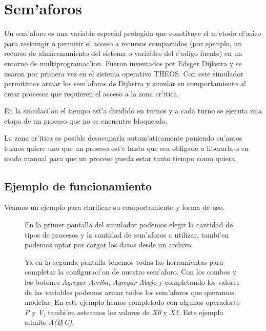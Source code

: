 \section{Sem'aforos}
Un sem'aforo es una variable especial protegida que constituye el m'etodo
cl'asico para restringir o permitir el acceso a recursos compartidos (por
ejemplo, un recurso de almacenamiento del sistema o variables del c'odigo
fuente) en un entorno de multiprogramac'ion. Fueron inventados por Edsger
Dijkstra y se usaron por primera vez en el sistema operativo THEOS.
Con este simulador permitimos armar los sem'aforos de Dijkstra y simular su
comportamiento al crear procesos que requieren el acceso a la zona cr'itica.

En la simulaci'on el tiempo est'a dividido en turnos y a cada turno se ejecuta
una etapa de un proceso que no se encuentre bloqueado. 

La zona cr'itica es posible desocuparla autom'aticamente poniendo cu'antos
turnos quiere uno que un proceso est'e hasta que sea obligado a liberarla o en
modo manual para que un proceso pueda estar tanto tiempo como quiera.

\subsection{Ejemplo de funcionamiento}
Veamos un ejemplo para clarificar su comportamiento y forma de uso.

\begin{figure}[h!]
\centering
 \caption{En la primer pantalla del simulador podemos elegir la cantidad de tipos de procesos y la cantidad de sem'aforos a utilizar, tambi'en podemos optar por cargar los datos desde un archivo.}
\end{figure}
\newpage

\begin{figure}[h!]
\centering
 \caption{Ya en la segunda pantalla tenemos todas las herramientas para completar la configuraci'on de nuestro sem'aforo. Con los combos y los botones \emph{Agregar Arriba}, \emph{Agregar Abajo} y completando los valores de las variables podemos armar todos los sem'aforos que queramos modelar. En este ejemplo hemos completado con algunos operadores \emph{P} y \emph{V}, tambi'en seteamos los valores de \emph{X0} y \emph{X1}. Este ejemplo admite \emph{A(B}$|$\emph{C)}.}
\end{figure}

